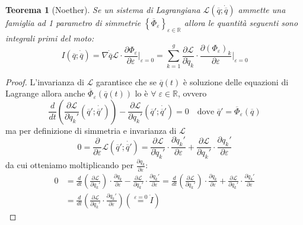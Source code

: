 \documentclass{book}
\theoremstyle{plain}
\newtheorem{teo}{Teorema}[chapter]
\theoremstyle{plain}
\theoremstyle{plain}
\theoremstyle{plain}
\theoremstyle{plain}
\theoremstyle{definition}
\theoremstyle{remark}
\theoremstyle{definition}
\begin{document}
\begin{teo}[Noether]
    Se un sistema di Lagrangiana $\mathcal{L}(\overline{q};\dot{\overline{q}})$ ammette una famiglia ad 1 parametro di simmetrie $\left\{\overline{\Phi}_{\varepsilon}\right\}_{\varepsilon\in\mathbb{R}}$ allora le quantità seguenti sono integrali primi del moto:
    \begin{displaymath}
    \boxed{
        I(\overline{q};\dot{\overline{q}})=\nabla\dot{\overline{q}}\mathcal{L}\cdot\frac{\partial\Phi_{\varepsilon}}{\partial\varepsilon}\bigg|_{\varepsilon=0}=\sum_{k=1}^g\frac{\partial\mathcal{L}}{\partial\dot{q}_k}\cdot \frac{\partial(\Phi_{\varepsilon})_k}{\partial\varepsilon}\bigg|_{\varepsilon=0}
        }
    \end{displaymath}
\end{teo}

\begin{proof}
    L'invarianza di $\mathcal{L}$ garantisce che se $\overline{q}(t)$ è soluzione delle equazioni di Lagrange allora anche $\overline{\Phi}_\varepsilon(\overline{q}(t))$ lo è $\forall\;\varepsilon\in\mathbb{R}$, ovvero
    \begin{displaymath}
        \frac{d}{dt}\left(\frac{\partial\mathcal{L}}{\partial\Dot{q}_k'}(\overline{q}';\dot{\overline{q}'})\right)-\frac{\partial\mathcal{L}}{\partial q_k'}(\overline{q}';\dot{\overline{q}'})=0\quad\text{dove } \overline{q}'=\overline{\Phi}_\varepsilon(\overline{q})
    \end{displaymath}
    ma per definizione di simmetria e invarianza di $\mathcal{L}$
    \begin{displaymath}
        0=\frac{\partial}{\partial\varepsilon}\mathcal{L}(\overline{q}';\dot{\overline{q}'})=\frac{\partial\mathcal{L}}{\partial\Dot{q}_k'}\cdot\frac{\partial\Dot{q}_k'}{\partial\varepsilon}+\frac{\partial\mathcal{L}}{\partial q_k'}\cdot\frac{\partial q_k'}{\partial\varepsilon}
    \end{displaymath}
    da cui otteniamo moltiplicando per $\frac{\partial q_k}{\partial\varepsilon}$:
    \[
    \begin{split}
        0&=\frac{d}{dt}\left(\frac{\partial\mathcal{L}}{\partial\Dot{q}_k'}\right)\cdot\frac{\partial q_k}{\partial\varepsilon}-\frac{\partial\mathcal{L}}{\partial q_k'}\cdot\frac{\partial q_k'}{\partial\varepsilon}=\frac{d}{dt}\left(\frac{\partial\mathcal{L}}{\partial\Dot{q}_k'}\right)\cdot\frac{\partial q_k}{\partial\varepsilon}+\frac{\partial\mathcal{L}}{\partial\Dot{q}_k'}\cdot\frac{\partial\Dot{q}_k'}{\partial\varepsilon} \\
        &=\frac{d}{dt}\left(\frac{\partial\mathcal{L}}{\partial\Dot{q}_k'}\cdot\frac{\partial q_k'}{\partial\varepsilon}\right)\left(\overset{\varepsilon=0}{=}\Dot{I}\right)
    \end{split}
    \]
\end{proof}
\end{document}

